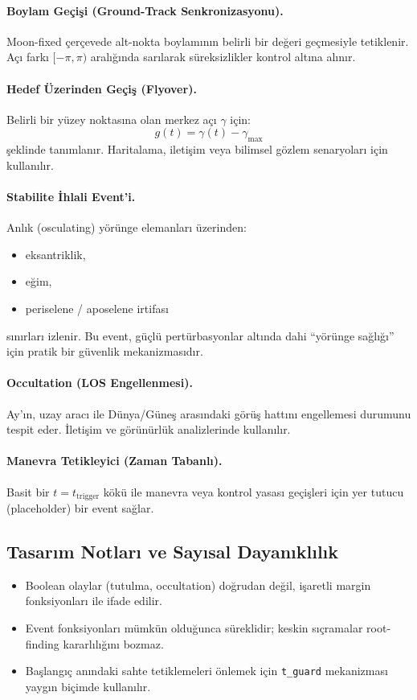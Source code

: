 \paragraph{Boylam Geçişi (Ground-Track Senkronizasyonu).}
Moon-fixed çerçevede alt-nokta boylamının
belirli bir değeri geçmesiyle tetiklenir.
Açı farkı \([-\pi,\pi)\) aralığında sarılarak
süreksizlikler kontrol altına alınır.

\paragraph{Hedef Üzerinden Geçiş (Flyover).}
Belirli bir yüzey noktasına olan merkez açı
\(\gamma\) için:
\[
g(t)=\gamma(t)-\gamma_{\max}
\]
şeklinde tanımlanır. Haritalama, iletişim veya
bilimsel gözlem senaryoları için kullanılır.

\paragraph{Stabilite İhlali Event’i.}
Anlık (osculating) yörünge elemanları üzerinden:
\begin{itemize}
  \item eksantriklik,
  \item eğim,
  \item periselene / aposelene irtifası
\end{itemize}
sınırları izlenir.
Bu event, güçlü pertürbasyonlar altında dahi
“yörünge sağlığı” için pratik bir güvenlik mekanizmasıdır.

\paragraph{Occultation (LOS Engellenmesi).}
Ay’ın, uzay aracı ile Dünya/Güneş arasındaki görüş hattını
engellemesi durumunu tespit eder.
İletişim ve görünürlük analizlerinde kullanılır.

\paragraph{Manevra Tetikleyici (Zaman Tabanlı).}
Basit bir \(t=t_{\text{trigger}}\) kökü ile
manevra veya kontrol yasası geçişleri için
yer tutucu (placeholder) bir event sağlar.

\subsection*{Tasarım Notları ve Sayısal Dayanıklılık}
\begin{itemize}
  \item Boolean olaylar (tutulma, occultation) doğrudan değil, işaretli margin fonksiyonları ile ifade edilir.
  \item Event fonksiyonları mümkün olduğunca
  süreklidir; keskin sıçramalar root-finding kararlılığını bozmaz.
  \item Başlangıç anındaki sahte tetiklemeleri önlemek için
  \texttt{t\_guard} mekanizması yaygın biçimde kullanılır.
\end{itemize}

